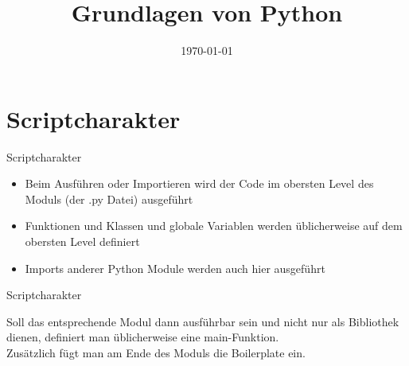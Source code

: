 

\usepackage{comment}

\newcommand{\topic}{
	Grundlagen von Python
}

\title{\topic}
\supertitle{\course}
\date{\today}



\maketitle

\begin{frame}
	\tableofcontents
\end{frame}



\section{Scriptcharakter}
\begin{frame}[fragile]{Scriptcharakter}
	\begin{itemize}
		\item Beim Ausführen oder Importieren wird der Code im obersten Level des Moduls (der .py Datei) ausgeführt
		\item Funktionen und Klassen und globale Variablen werden üblicherweise auf dem obersten Level definiert
		\item Imports anderer Python Module werden auch hier ausgeführt
	\end{itemize}
\end{frame}

\begin{frame}[fragile]{Scriptcharakter}
	
	Soll das entsprechende Modul dann ausführbar sein und nicht nur als Bibliothek dienen, definiert man üblicherweise eine main-Funktion.\\
	Zus\"atzlich f\"ugt man am Ende des Moduls die Boilerplate ein.\\
\end{frame}

